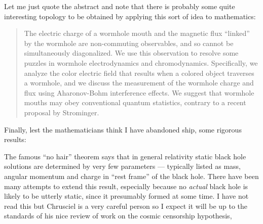 \documentclass{article}
\def\tightlist{}
\renewcommand{\texttt}[1]{%
  \begingroup
  \ttfamily
  \begingroup\lccode`~=`/\lowercase{\endgroup\def~}{/\discretionary{}{}{}}%
  \begingroup\lccode`~=`[\lowercase{\endgroup\def~}{[\discretionary{}{}{}}%
  \begingroup\lccode`~=`.\lowercase{\endgroup\def~}{.\discretionary{}{}{}}%
  \catcode`/=\active\catcode`[=\active\catcode`.=\active
  \scantokens{#1\noexpand}%
  \endgroup
}
\begin{document}

Let me just quote the abstract and note that there is probably some
quite interesting topology to be obtained by applying this sort of idea
to mathematics:

\begin{quote}
The electric charge of a wormhole mouth and the magnetic flux ``linked''
by the wormhole are non-commuting observables, and so cannot be
simultaneously diagonalized. We use this observation to resolve some
puzzles in wormhole electrodynamics and chromodynamics. Specifically, we
analyze the color electric field that results when a colored object
traverses a wormhole, and we discuss the measurement of the wormhole
charge and flux using Aharonov-Bohm interference effects. We suggest
that wormhole mouths may obey conventional quantum statistics, contrary
to a recent proposal by Strominger.
\end{quote}

Finally, lest the mathematicians think I have abandoned ship, some
rigorous results:


The famous ``no hair'' theorem says that in general relativity static
black hole solutions are determined by very few parameters --- typically
listed as mass, angular momentum and charge in ``rest frame'' of the
black hole. There have been many attempts to extend this result,
especially because no \emph{actual} black hole is likely to be utterly
static, since it presumably formed at some time. I have not read this
but Chrusciel is a very careful person so I expect it will be up to the
standards of his nice review of work on the cosmic censorship
hypothesis,
\end{document}
